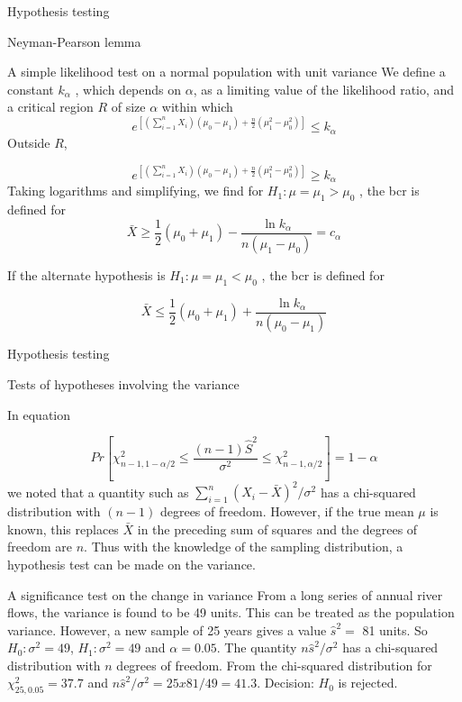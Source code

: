 \documentclass[8pt]{beamer}
\renewcommand{\emph}[1]{\textcolor{myorange}{#1}}
\begin{document}
\begin{frame}{Hypothesis testing}
    \begin{block}{Neyman-Pearson lemma}
    \end{block}
    \begin{exampleblock}{A simple likelihood test on a normal population with unit variance}
        We define a constant $k_{\alpha}$ , which depends on $\alpha$, as a limiting value of the likelihood ratio, and a critical region $R$ of size $\alpha$ within which
        \[
            e^{\left[ \left(\sum_{i=1}^n X_i \right) (\mu_0 - \mu_1) + \frac{n}{2} \left( \mu_1^2 - \mu_0^2 \right) \right]} \leq k_{\alpha}
        \]
        Outside $R$,

        \[
            e^{\left[ \left(\sum_{i=1}^n X_i \right) (\mu_0 - \mu_1) + \frac{n}{2} \left( \mu_1^2 - \mu_0^2 \right) \right]} \geq k_{\alpha}
        \]
        Taking logarithms and simplifying, we find for $H_1 : \mu = \mu_1 > \mu_0$ , the \emph{bcr} is defined for
        \[
            \bar{X} \geq \frac{1}{2} (\mu_0 + \mu_1) - \frac{\ln k_{\alpha}}{n(\mu_1 - \mu_0)} = c_{\alpha}
        \]


        If the alternate hypothesis is $H_1 : \mu = \mu_1 < \mu_0$ , the \emph{bcr} is defined for

        \[
            \bar{X} \leq \frac{1}{2} (\mu_0 + \mu_1) + \frac{\ln k_{\alpha}}{n(\mu_0 - \mu_1)} 
        \]
    \end{exampleblock}
\end{frame}

\begin{frame}{Hypothesis testing}
    \begin{block}{Tests of hypotheses involving the variance}
    \end{block}
    In equation 

\[
    Pr \left[ \chi^2_{n-1, 1- \alpha/2} \leq \frac{(n-1)\hat{S}^2}{\sigma^2} \leq  \chi^2_{n-1, \alpha/2} \right] = 1-\alpha
\]
    we noted that a quantity such as $\sum_{i=1}^n (X_i - \bar{X} )^2 /\sigma^2$ has a \emph{chi-squared distribution} with $(n - 1)$ degrees of freedom. However, if the true mean $\mu$ is known, this replaces $\bar{X}$ in the preceding sum of squares and the degrees of freedom are $n$. Thus with the knowledge of the sampling distribution, a hypothesis test can be made on the variance.

    \begin{exampleblock}{A significance test on the change in variance}
        From a long series of annual river flows, the variance is found to be 49 units. This can be treated as the population variance. However, a new sample of 25 years gives a value $\hat{s}^2 =$ 81 units. So $H_0 : \sigma^2 = 49$, $H_1 : \sigma^2 = 49$ and $\alpha = 0.05$. 
        The quantity $n \hat{s}^2/\sigma^2$ has a \emph{chi-squared distribution} with $n$ degrees of freedom. From the \emph{chi-squared distribution} for $\chi_{25,0.05}^2 = 37.7$ and $n \hat{s}^2 / \sigma^2 = 25 x 81/49 = 41.3$. \emph{Decision: $H_0$ is rejected}.  
    \end{exampleblock}
\end{frame}
\end{document}
